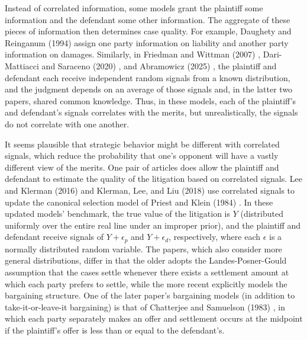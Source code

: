 \documentclass{article}
\begin{document}
Instead of correlated information, some models grant the plaintiff some information and the defendant some other information. The aggregate of these pieces of information then determines case quality. For example, Daughety and Reinganum (1994) \cite{daughetyreinganum1994} assign one party information on liability and another party information on damages. Similarly, in Friedman and Wittman (2007) \cite{friedmanwittman}, Dari-Mattiacci and Saraceno (2020) \cite{darimatiaccisaraceno}, and Abramowicz (2025) \cite{abramowicz}, the plaintiff and defendant each receive independent random signals from a known distribution, and the judgment depends on an average of those signals and, in the latter two papers, shared common knowledge. Thus, in these models, each of the plaintiff's and defendant's signals correlates with the merits, but unrealistically, the signals do not correlate with one another. 

It seems plausible that strategic behavior might be different with correlated signals, which reduce the probability that one's opponent will have a vastly different view of the merits. One pair of articles does allow the plaintiff and defendant to estimate the quality of the litigation based on correlated signals. Lee and Klerman (2016) \cite{leeklerman} and Klerman, Lee, and Liu (2018) \cite{klermanleeliu} use correlated signals to update the canonical selection model of Priest and Klein (1984) \cite{priestklein}. In these updated models' benchmark, the true value of the litigation is $Y$ (distributed uniformly over the entire real line under an improper prior), and the plaintiff and defendant receive signals of $Y + \epsilon_p$ and $Y + \epsilon_d$, respectively, where each $\epsilon$ is a normally distributed random variable. The papers, which also consider more general distributions, differ in that the older adopts the Landes-Posner-Gould assumption that the cases settle whenever there exists a settlement amount at which each party prefers to settle, while the more recent explicitly models the bargaining structure. One of the later paper's bargaining models (in addition to take-it-or-leave-it bargaining) is that of Chatterjee and Samuelson (1983) \cite{chatterjeesamuelson}, in which each party separately makes an offer and settlement occurs at the midpoint if the plaintiff's offer is less than or equal to the defendant's. 
\end{document}
